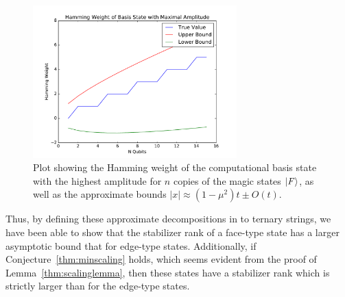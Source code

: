\documentclass{standalone}
\begin{document}
\begin{figure}
    \centering
    \includegraphics[width=0.7\textwidth]{Figures/computational_bound.pdf}
    \caption{Plot showing the Hamming weight of the computational basis state with the highest amplitude for $n$ copies of the magic states $\ket{F}$, as well as the approximate bounds $\vert x \vert \approx (1-\mu^{2})t\pm O(t)$.}
    \label{fig:compbasis}
\end{figure}

Thus, by defining these approximate decompositions in to ternary strings, we have been able to show that the stabilizer rank of a face-type state has a larger asymptotic bound that for edge-type states. Additionally, if Conjecture~\ref{thm:minscaling} holds, which seems evident from the proof of Lemma~\ref{thm:scalinglemma}, then these states have a stabilizer rank which is strictly larger than for the edge-type states.
\end{document}
